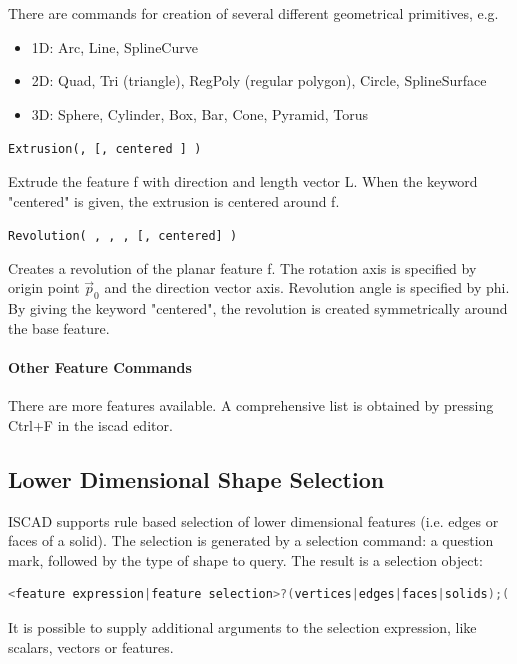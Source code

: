 There are commands for creation of several different geometrical
primitives, e.g.
\begin{itemize}
\item 1D: Arc, Line, SplineCurve
\item 2D: Quad, Tri (triangle), RegPoly (regular polygon), Circle,
    SplineSurface
\item 3D: Sphere, Cylinder, Box, Bar, Cone, Pyramid, Torus
\end{itemize}


\texttt{Extrusion(,  [, centered ] )}

Extrude the feature f with direction and length vector L. When the
keyword "centered" is given, the extrusion is centered around f.

\texttt{Revolution( , , ,  [, centered] )}

Creates a revolution of the planar feature f. The rotation axis is
specified by origin point $\vec p_0$ and the direction vector axis.
Revolution angle is specified by phi. By giving the keyword
"centered", the revolution is created symmetrically around the base
feature.

\paragraph{Other Feature Commands}

There are more features available. A comprehensive list is obtained by
pressing Ctrl+F in the iscad editor.

\subsection{Lower Dimensional Shape Selection}

ISCAD supports rule based selection of lower dimensional features (i.e. edges or faces of a solid). 
The selection is generated by a selection command: a question mark, followed
by the type of shape to query. 
The result is a selection object:

\begin{lstlisting}[language=c++]
<feature expression|feature selection>?(vertices|edges|faces|solids);('<command string>' [, parameter 0 [, ..., parameter n] ] )
\end{lstlisting}

It is possible to supply additional arguments to the selection
expression, like scalars, vectors or features.

